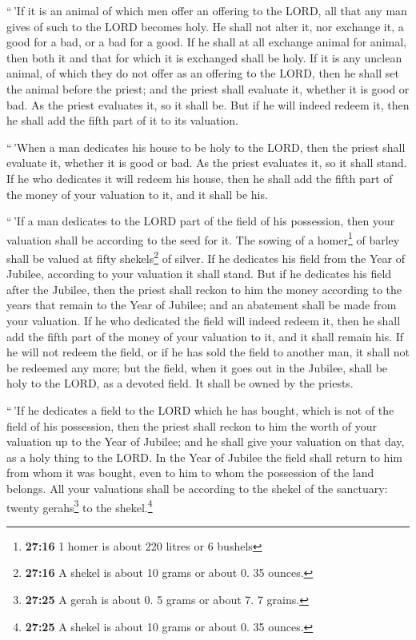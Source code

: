 ``\,'If it is an animal of which men offer an offering to
the LORD, all that any man gives of such to the LORD becomes holy.
 He shall not alter it, nor exchange it, a good for a
bad, or a bad for a good. If he shall at all exchange animal for animal,
then both it and that for which it is exchanged shall be holy.
 If it is any unclean animal, of which they do not offer
as an offering to the LORD, then he shall set the animal before the
priest;  and the priest shall evaluate it, whether it is
good or bad. As the priest evaluates it, so it shall be. 
But if he will indeed redeem it, then he shall add the fifth part of it
to its valuation.

 ``\,'When a man dedicates his house to be holy to the
LORD, then the priest shall evaluate it, whether it is good or bad. As
the priest evaluates it, so it shall stand.  If he who
dedicates it will redeem his house, then he shall add the fifth part of
the money of your valuation to it, and it shall be his.

 ``\,'If a man dedicates to the LORD part of the field of
his possession, then your valuation shall be according to the seed for
it. The sowing of a homer\footnote{\textbf{27:16} 1 homer is about 220
  litres or 6 bushels} of barley shall be valued at fifty
shekels\footnote{\textbf{27:16} A shekel is about 10 grams or about 0.
  35 ounces.} of silver.  If he dedicates his field from
the Year of Jubilee, according to your valuation it shall stand.
 But if he dedicates his field after the Jubilee, then
the priest shall reckon to him the money according to the years that
remain to the Year of Jubilee; and an abatement shall be made from your
valuation.  If he who dedicated the field will indeed
redeem it, then he shall add the fifth part of the money of your
valuation to it, and it shall remain his.  If he will not
redeem the field, or if he has sold the field to another man, it shall
not be redeemed any more;  but the field, when it goes
out in the Jubilee, shall be holy to the LORD, as a devoted field. It
shall be owned by the priests.

 ``\,'If he dedicates a field to the LORD which he has
bought, which is not of the field of his possession, 
then the priest shall reckon to him the worth of your valuation up to
the Year of Jubilee; and he shall give your valuation on that day, as a
holy thing to the LORD.  In the Year of Jubilee the field
shall return to him from whom it was bought, even to him to whom the
possession of the land belongs.  All your valuations
shall be according to the shekel of the sanctuary: twenty
gerahs\footnote{\textbf{27:25} A gerah is about 0. 5 grams or about 7. 7
  grains.} to the shekel.\footnote{\textbf{27:25} A shekel is about 10
  grams or about 0. 35 ounces.}

